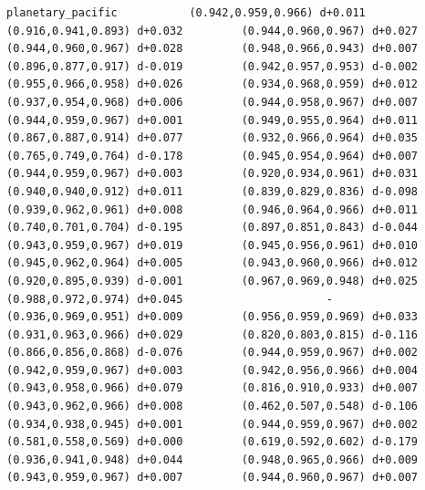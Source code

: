 \documentclass[11pt, letterpaper, openany]{book}
\begin{document}
\begin{empiricalbox}
\begin{lstlisting}[style=terminal]
planetary_pacific           (0.942,0.959,0.966) d+0.011         (0.916,0.941,0.893) d+0.032         (0.944,0.960,0.967) d+0.027         (0.944,0.960,0.967) d+0.028         (0.948,0.966,0.943) d+0.007         (0.896,0.877,0.917) d-0.019         (0.942,0.957,0.953) d-0.002         (0.955,0.966,0.958) d+0.026         (0.934,0.968,0.959) d+0.012         (0.937,0.954,0.968) d+0.006         (0.944,0.958,0.967) d+0.007         (0.944,0.959,0.967) d+0.001         (0.949,0.955,0.964) d+0.011         (0.867,0.887,0.914) d+0.077         (0.932,0.966,0.964) d+0.035         (0.765,0.749,0.764) d-0.178         (0.945,0.954,0.964) d+0.007         (0.944,0.959,0.967) d+0.003         (0.920,0.934,0.961) d+0.031         (0.940,0.940,0.912) d+0.011         (0.839,0.829,0.836) d-0.098         (0.939,0.962,0.961) d+0.008         (0.946,0.964,0.966) d+0.011         (0.740,0.701,0.704) d-0.195         (0.897,0.851,0.843) d-0.044         (0.943,0.959,0.967) d+0.019         (0.945,0.956,0.961) d+0.010         (0.945,0.962,0.964) d+0.005         (0.943,0.960,0.966) d+0.012         (0.920,0.895,0.939) d-0.001         (0.967,0.969,0.948) d+0.025         (0.988,0.972,0.974) d+0.045                      -                      (0.936,0.969,0.951) d+0.009         (0.956,0.959,0.969) d+0.033         (0.931,0.963,0.966) d+0.029         (0.820,0.803,0.815) d-0.116         (0.866,0.856,0.868) d-0.076         (0.944,0.959,0.967) d+0.002         (0.942,0.959,0.967) d+0.003         (0.942,0.956,0.966) d+0.004         (0.943,0.958,0.966) d+0.079         (0.816,0.910,0.933) d+0.007         (0.943,0.962,0.966) d+0.008         (0.462,0.507,0.548) d-0.106         (0.934,0.938,0.945) d+0.001         (0.944,0.959,0.967) d+0.002         (0.581,0.558,0.569) d+0.000         (0.619,0.592,0.602) d-0.179         (0.936,0.941,0.948) d+0.044         (0.948,0.965,0.966) d+0.009         (0.943,0.959,0.967) d+0.007         (0.944,0.960,0.967) d+0.007     

\end{lstlisting}
\end{empiricalbox}
\end{document}
